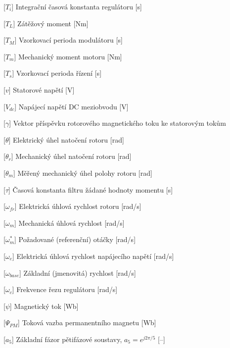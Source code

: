 \begin{acronym}[DSP48E1]
    [\ensuremath{T_i}]
    {Integrační časová konstanta regulátoru \hfill [s]}

    [\ensuremath{T_L}]
    {Zátěžový moment \hfill [Nm]}

    [\ensuremath{T_M}]
    {Vzorkovací perioda modulátoru \hfill [s]}

    [\ensuremath{T_m}]
    {Mechanický moment motoru \hfill [Nm]}

    [\ensuremath{T_s}]
    {Vzorkovací perioda řízení \hfill [s]}

    [\ensuremath{v}]
    {Statorové napětí \hfill [V]}

    [\ensuremath{V_{dc}}]
    {Napájecí napětí DC meziobvodu \hfill [V]}


    [\ensuremath{\gamma}]
    {Vektor příspěvku rotorového magnetického toku ke statorovým tokům}

    [\ensuremath{\theta}]
    {Elektrický úhel natočení rotoru \hfill [rad]}

    [\ensuremath{\theta_r}]
    {Mechanický úhel natočení rotoru \hfill [rad]}

    [\ensuremath{\theta_m}]
    {Měřený mechanický úhel polohy rotoru \hfill [rad]}

    [\ensuremath{\tau}]
    {Časová konstanta filtru žádané hodnoty momentu \hfill [s]}

    [\ensuremath{\omega_{fr}}]
    {Elektrická úhlová rychlost rotoru \hfill [rad/s]}

    [\ensuremath{\omega_m}]
    {Mechanická úhlová rychlost \hfill [rad/s]}

    [\ensuremath{\omega_m^*}]
    {Požadované (referenční) otáčky \hfill [rad/s]}

    [\ensuremath{\omega_e}]
    {Elektrická úhlová rychlost napájecího napětí \hfill [rad/s]}

    [\ensuremath{\omega_{base}}]
    {Základní (jmenovitá) rychlost \hfill [rad/s]}

    [\ensuremath{\omega_c}]
    {Frekvence řezu regulátoru \hfill [rad/s]}

    [\ensuremath{\psi}]
    {Magnetický tok \hfill [Wb]}

    [\ensuremath{\Psi_{PM}}]
    {Toková vazba permanentního magnetu \hfill [Wb]}

    [\ensuremath{a_5}]
    {Základní fázor pětifázové soustavy, $a_5 = e^{j2\pi/5}$ \hfill [--]}

\end{acronym}
